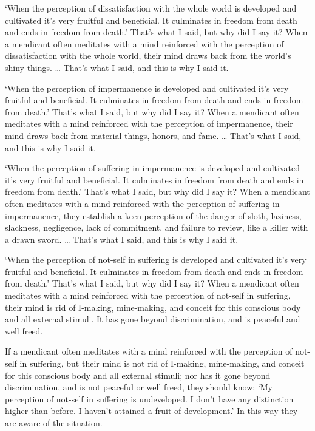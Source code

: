 \documentclass[12pt,openany]{book}%
\begin{document}
‘When the perception of dissatisfaction with the whole world is developed and cultivated it’s very fruitful and beneficial. It culminates in freedom from death and ends in freedom from death.’ That’s what I said, but why did I say it? When a mendicant often meditates with a mind reinforced with the perception of dissatisfaction with the whole world, their mind draws back from the world’s shiny things. … That’s what I said, and this is why I said it. 

‘When the perception of impermanence is developed and cultivated it’s very fruitful and beneficial. It culminates in freedom from death and ends in freedom from death.’ That’s what I said, but why did I say it? When a mendicant often meditates with a mind reinforced with the perception of impermanence, their mind draws back from material things, honors, and fame. … That’s what I said, and this is why I said it. 

‘When the perception of suffering in impermanence is developed and cultivated it’s very fruitful and beneficial. It culminates in freedom from death and ends in freedom from death.’ That’s what I said, but why did I say it? When a mendicant often meditates with a mind reinforced with the perception of suffering in impermanence, they establish a keen perception of the danger of sloth, laziness, slackness, negligence, lack of commitment, and failure to review, like a killer with a drawn sword. … That’s what I said, and this is why I said it. 

‘When the perception of not-self in suffering is developed and cultivated it’s very fruitful and beneficial. It culminates in freedom from death and ends in freedom from death.’ That’s what I said, but why did I say it? When a mendicant often meditates with a mind reinforced with the perception of not-self in suffering, their mind is rid of I-making, mine-making, and conceit for this conscious body and all external stimuli. It has gone beyond discrimination, and is peaceful and well freed. 

If a mendicant often meditates with a mind reinforced with the perception of not-self in suffering, but their mind is not rid of  I-making, mine-making, and conceit for this conscious body and all external stimuli; nor has it gone beyond discrimination, and is not peaceful or well freed, they should know: ‘My perception of not-self in suffering is undeveloped. I don’t have any distinction higher than before. I haven’t attained a fruit of development.’ In this way they are aware of the situation. 
\end{document}
